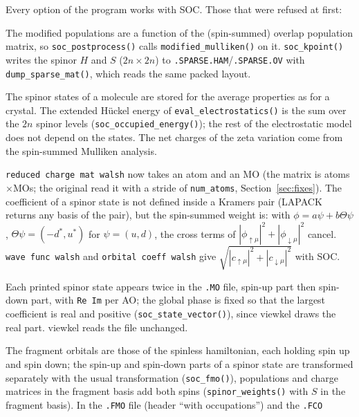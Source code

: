 \documentclass[11pt,a4paper]{article}
\newcommand{\fn}[1]{\texttt{#1()}}
\newcommand{\var}[1]{\texttt{#1}}
\begin{document}
Every option of the program works with SOC. Those that were refused at first:
\begin{description}[style=nextline,leftmargin=1.2em]
\item[Modified Mulliken analysis, sparse dumps] The modified populations are a function of
  the (spin-summed) overlap population matrix, so \fn{soc\_postprocess} calls
  \fn{modified\_mulliken} on it. \fn{soc\_kpoint} writes the spinor $H$ and $S$
  ($2n\times2n$) to \texttt{.SPARSE.HAM}/\texttt{.SPARSE.OV} with \fn{dump\_sparse\_mat},
  which reads the same packed layout.
\item[Molecules: average properties, electrostatic energy, zeta variation] The spinor
  states of a molecule are stored for the average properties as for a crystal. The
  extended Hückel energy of \fn{eval\_electrostatics} is the sum over the $2n$ spinor
  levels (\fn{soc\_occupied\_energy}); the rest of the electrostatic model does not
  depend on the states. The net charges of the zeta variation come from the spin-summed
  Mulliken analysis.
\item[Walsh items with MO coefficients] \texttt{reduced charge mat walsh} now takes an atom
  and an MO (the matrix is atoms$\times$MOs; the original read it with a stride of
  \var{num\_atoms}, Section~\ref{sec:fixes}). The coefficient of a spinor state is not
  defined inside a Kramers pair (LAPACK returns any basis of the pair), but the spin-summed
  weight is: with $\phi=a\psi+b\Theta\psi$, $\Theta\psi=(-d^*,u^*)$ for $\psi=(u,d)$, the cross
  terms of $|\phi_{\uparrow\mu}|^2+|\phi_{\downarrow\mu}|^2$ cancel. \texttt{wave func walsh} and
  \texttt{orbital coeff walsh} give $\sqrt{|c_{\uparrow\mu}|^2+|c_{\downarrow\mu}|^2}$ with SOC.
\item[\texttt{MO print}] Each printed spinor state appears twice in the \texttt{.MO} file,
  spin-up part then spin-down part, with \texttt{Re Im} per AO; the global phase is fixed
  so that the largest coefficient is real and positive (\fn{soc\_state\_vector}), since
  viewkel draws the real part. viewkel reads the file unchanged.
\item[FMO/FCO] The fragment orbitals are those of the spinless hamiltonian, each holding
  spin up and spin down; the spin-up and spin-down parts of a spinor state are transformed
  separately with the usual transformation (\fn{soc\_fmo}), populations and charge matrices
  in the fragment basis add both spins (\fn{spinor\_weights} with $S$ in the fragment
  basis). In the \texttt{.FMO} file (header ``with occupations'') and the \texttt{.FCO}

\end{description}
\end{document}
